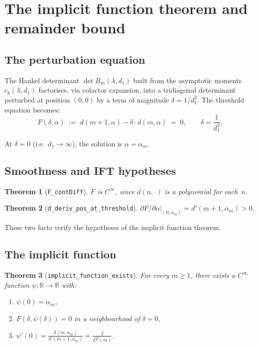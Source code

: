 \documentclass[11pt,a4paper]{article}
\theoremstyle{plain}
\newtheorem{theorem}{Theorem}[section]
\theoremstyle{definition}
\newcommand{\R}{\mathbb{R}}
\newcommand{\Dsq}{D^2}
\newcommand{\alpham}{\alpha_m}
\newcommand{\lean}[1]{\texttt{#1}}
\begin{document}
\section{The implicit function theorem and remainder bound}
\label{sec:ift}

\subsection{The perturbation equation}

The Hankel determinant $\det B_m(\lambda, d_1)$ built from the
asymptotic moments $c_k(\lambda, d_1)$ factorises, via cofactor
expansion, into a tridiagonal determinant perturbed at position
$(0,0)$ by a term of magnitude $\delta = 1/d_1^2$.
The threshold equation becomes:
\[
  F(\delta, \alpha) \;:=\; d(m{+}1, \alpha) - \delta \cdot d(m, \alpha) \;=\; 0,
  \qquad \delta = \frac{1}{d_1^2}.
\]

At $\delta = 0$ (i.e.\ $d_1 \to \infty$),
the solution is $\alpha = \alpham$.

\subsection{Smoothness and IFT hypotheses}

\begin{theorem}[\lean{F\_contDiff}]
$F$ is $C^\infty$, since $d(n, \cdot)$ is a polynomial for each~$n$.
\end{theorem}

\begin{theorem}[\lean{d\_deriv\_pos\_at\_threshold}]
\label{thm:deriv-pos}
$\partial F / \partial\alpha \big|_{(0,\alpham)} = d'(m{+}1,\alpham) > 0$.
\end{theorem}

These two facts verify the hypotheses of the implicit function theorem.

\subsection{The implicit function}

\begin{theorem}[\lean{implicit\_function\_exists}]
\label{thm:ift}
For every $m \ge 1$, there exists a $C^\infty$ function
$\psi \colon \R \to \R$ with:
\begin{enumerate}[label=(\roman*)]
  \item $\psi(0) = \alpham$,
  \item $F(\delta, \psi(\delta)) = 0$ in a neighbourhood of $\delta = 0$,
  \item $\displaystyle\psi'(0) = \frac{d(m,\alpham)}{d'(m{+}1,\alpham)} = \frac{2}{\Dsq(m)}$.
\end{enumerate}
\end{theorem}
\end{document}
